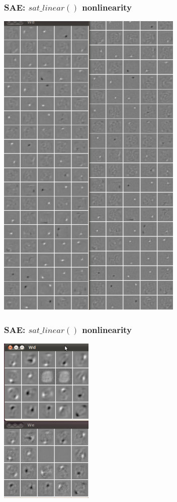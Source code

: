 \documentclass{beamer}
\begin{document}
\begin{frame}
\frametitle{SAE: $sat\_linear()$ nonlinearity} 
\begin{center} 
\includegraphics[scale = 0.35]{sat100.png}
\end{center} 
\end{frame} 

\begin{frame}
\frametitle{SAE: $sat\_linear()$ nonlinearity} 
\begin{center} 
\includegraphics[scale = 0.45]{sat20.png}
\end{center} 
\end{frame} 
\end{document}
